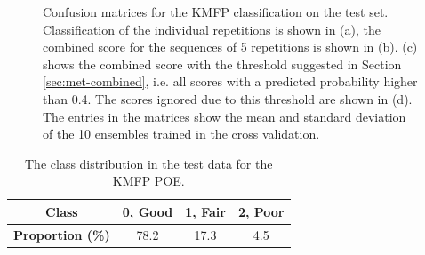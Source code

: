 \begin{figure}[h]
\begin{subfigure}[t]{0.48\textwidth}
      \caption{}
      \label{fig:kmfp-cnf-ignored}
  \end{subfigure}
  \caption{Confusion matrices for the KMFP classification on the test set. Classification of the individual repetitions is shown in (a), the combined score for the sequences of 5 repetitions is shown in (b). (c) shows the combined score with the threshold suggested in Section \ref{sec:met-combined}, i.e. all scores with a predicted probability higher than 0.4. The scores ignored due to this threshold are shown in (d). The entries in the matrices show the mean and standard deviation of the 10 ensembles trained in the cross validation.}
  \label{fig:kmfp-cnfs}
\end{figure}

\begin{table}[h]
  \caption{The class distribution in the test data for the KMFP POE.}
  \label{tab:kmfp-class-dist}
  \centering
  \begin{tabu}[c]{cccc}
    \textbf{Class}      & 0, Good & 1, Fair & 2, Poor \\ \hline \hline
    \textbf{Proportion (\%)} & 78.2 & 17.3 & 4.5 \\ %
  \end{tabu}
\end{table}

